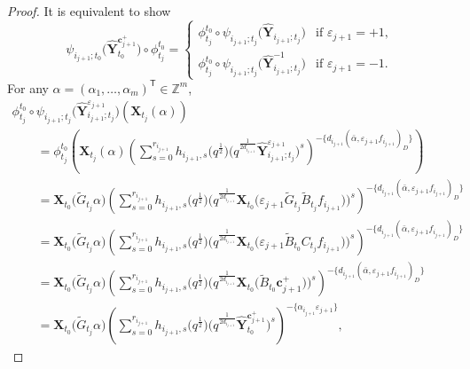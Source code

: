 \documentclass[11pt]{article}
\numberwithin{equation}{section}
\numberwithin{equation}{section}
\begin{document}
\begin{proof}
It is equivalent to show
 \[
 \psi_{i_{j+1};t_{0}}\bigl(\mathbf{\hat{Y}}_{t_{0}}^{\mathbf{c}_{j+1}^{+}}\bigr)\circ\phi_{t_{j}}^{t_{0}}=\begin{cases}
 \phi_{t_{j}}^{t_{0}}\circ\psi_{i_{j+1};t_{j}}\bigl(\mathbf{\hat{Y}}_{i_{j+1};t_{j}}\bigr) & \text{if $\varepsilon_{j+1}=+1$},\\
 \phi_{t_{j}}^{t_{0}}\circ\psi_{i_{j+1};t_{j}}\bigl(\mathbf{\hat{Y}}^{-1}_{i_{j+1};t_{j}}\bigr) & \text{if $\varepsilon_{j+1}=-1$.}
 \end{cases}
 \]
 For any $\alpha=(\alpha_{1},\dots,\alpha_{m})^{\mathsf T}\in\mathbb{Z}^{m}$,
 \begin{gather*}
  \phi_{t_{j}}^{t_{0}}\circ\psi_{i_{j+1};t_{j}}\bigl(\mathbf{\hat{Y}}_{i_{j+1};t_{j}}^{\varepsilon_{j+1}}\bigr)(\mathbf{X}_{t_{j}}(\alpha))\\
  \qquad=\phi_{t_{j}}^{t_{0}}\left(\mathbf{X}_{t_{j}}(\alpha)\left(\sum\limits_{s=0}^{r_{i_{j+1}}} h_{i_{j+1},s}\bigl(q^{\frac{1}{2}}\bigr)\bigl(q^{\frac{1}{2d_{i_{j+1}}}}\mathbf{\hat{Y}}_{i_{j+1};t_{j}}^{\varepsilon_{j+1}}\bigr)^{s}\right)^{-\{d_{i_{j+1}}(\bar{\alpha},\varepsilon_{j+1}f_{i_{j+1}})_D\}}\right)\\
 \qquad =\mathbf{X}_{t_{0}}\bigl(\tilde{G}_{t_{j}}\alpha\bigr)\left(\sum\limits_{s=0}^{r_{i_{j+1}}} h_{i_{j+1},s}\bigl(q^{\frac{1}{2}}\bigr)\bigl(q^{\frac{1}{2d_{i_{j+1}}}}\mathbf{X}_{t_0}\bigl(\varepsilon_{j+1}\tilde{G}_{t_{j}}\tilde{B}_{t_{j}}f_{i_{j+1}}\bigr)\bigr)^{s}\right)^{-\{d_{i_{j+1}}(\bar{\alpha},\varepsilon_{j+1}f_{i_{j+1}})_D\}}\\
 \qquad =\mathbf{X}_{t_{0}}\bigl(\tilde{G}_{t_{j}}\alpha\bigr)\left(\sum\limits_{s=0}^{r_{i_{j+1}}} h_{i_{j+1},s}\bigl(q^{\frac{1}{2}}\bigr)\bigl(q^{\frac{1}{2d_{i_{j+1}}}}\mathbf{X}_{t_0}\bigl(\varepsilon_{j+1}\tilde{B}_{t_{0}}C_{t_{j}}f_{i_{j+1}}\bigr)\bigr)^{s}\right)^{-\{d_{i_{j+1}}(\bar{\alpha},\varepsilon_{j+1}f_{i_{j+1}})_D\}}\\
 \qquad =\mathbf{X}_{t_{0}}\bigl(\tilde{G}_{t_{j}}\alpha\bigr)\left(\sum\limits_{s=0}^{r_{i_{j+1}}} h_{i_{j+1},s}\bigl(q^{\frac{1}{2}}\bigr)\bigl(q^{\frac{1}{2d_{i_{j+1}}}}\mathbf{X}_{t_0}\bigl(\tilde{B}_{t_{0}}\mathbf{c}_{j+1}^{+}\bigr)\bigr)^{s}\right)^{-\{d_{i_{j+1}}(\bar{\alpha},\varepsilon_{j+1}f_{i_{j+1}})_D\}}\\
 \qquad =\mathbf{X}_{t_{0}}\bigl(\tilde{G}_{t_{j}}\alpha\bigr)\left(\sum\limits_{s=0}^{r_{i_{j+1}}} h_{i_{j+1},s}\bigl(q^{\frac{1}{2}}\bigr)\bigl(q^{\frac{1}{2d_{i_{j+1}}}}\mathbf{\hat{Y}}_{t_{0}}^{\mathbf{c}_{j+1}^{+}}\bigr)^{s}\right)^{-\{\alpha_{i_{j+1}}\varepsilon_{j+1}\}},

\end{gather*}
\end{proof}
\end{document}
